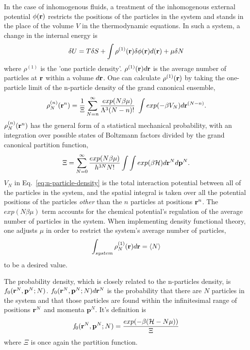 In the case of inhomogenous fluids, a treatment of the inhomogenous
external potential $\phi(\textbf{r})$ restricts the positions of the
particles in the system and stands in the place of the volume $V$ in
the thermodynamic equations.  In such a system, a change in the
internal energy is
\begin{align}
  \delta U = T\delta S + \int \rho^{(1)}(\textbf{r})\delta \phi(\textbf{r})d(\textbf{r}) + \mu \delta N
\end{align}
where $\rho^{(1)}$ is the 'one particle density'.
$\rho^{(1)}(\textbf{r})d\textbf{r}$ is the average number of particles at $\textbf{r}$
within a volume $d\textbf{r}$.  One can calculate $\rho^{(1)}(\textbf{r})$ by taking
the one-particle limit of the n-particle density of the grand
canonical ensemble,
\begin{align}
  \label{eq:n-particle-density}
  \rho_N^{(n)}(\textbf{r}^n)=\frac{1}{\Xi}\sum^{\infty}_{N=n}\frac{exp(N\beta \mu)}{\Lambda^3 (N-n)!} \
  \int exp(-\beta V_N)d\textbf{r}^{(N-n)}.
\end{align}
$\rho_N^{(n)}(\textbf{r}^n)$ has the general form of a statistical mechanical
probability, with an integration over possible states of Boltzmann
factors divided by the grand canonical partition function,
\begin{align}
  \Xi = \sum_{N=0}^{\infty}\frac{exp(N\beta\mu)}{h^{3N}N!}\int\int exp(\beta \mathcal{H})d\textbf{r}^Nd\mathbf{p}^N.
\end{align}
$V_N$ in Eq.~\ref{eq:n-particle-density} is the total interaction
potential between all of the particles in the system, and the spatial
integral is taken over all the potential positions of the particles
\emph{other} than the $n$ particles at positions $\textbf{r}^n$.  The
$exp(N\beta \mu)$ term accounts for the chemical potential's
regulation of the average number of particles in the system.  When
implementing density functional theory, one adjusts $\mu$ in order to
restrict the system's average number of particles,
\begin{align}
  \int_{system} \rho_N^{(1)}(\textbf{r})d\textbf{r} = \langle N \rangle
\end{align}
to be a desired value.

The probability density, which is closely related to the n-particles
density, is $f_0(\textbf{r}^N,\mathbf{p}^N;N)$.
$f_0(\textbf{r}^N,\mathbf{p}^N;N)d\textbf{r}^N$ is the probability that there are
$N$ particles in the system and that those particles are found within
the infinitesimal range of positions $\textbf{r}^N$ and momenta
$\mathbf{p}^N$.  It's definition is
\begin{align}
  \label{eq:prob-density}
  \mathit{f}_0(\textbf{r}^N,\mathbf{p}^N;N) = \frac{exp(-\beta(\mathcal{H}-N\mu))}{\Xi}
\end{align}
where $\Xi$ is once again the partition
function.

